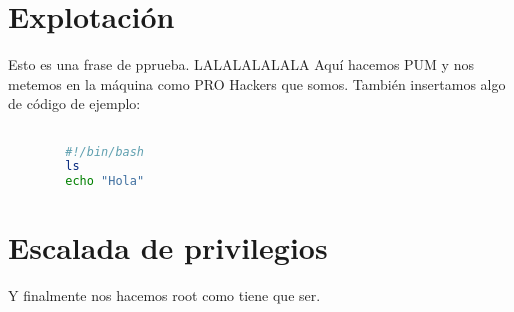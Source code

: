 \documentclass[a4paper]{article} %
\begin{document}
	\section{Explotación}
	Esto es una frase de pprueba. LALALALALALA
	Aquí hacemos PUM y nos metemos en la máquina como PRO Hackers que somos. También insertamos algo de código de ejemplo: 
	
	\begin{lstlisting}[language=Bash, caption=Código de ejemplo]

		#!/bin/bash
		ls
		echo "Hola"
	\end{lstlisting}
	
	
	
	\section{Escalada de privilegios}
	Y finalmente nos hacemos root como tiene que ser. 
	
	
\end{document}
